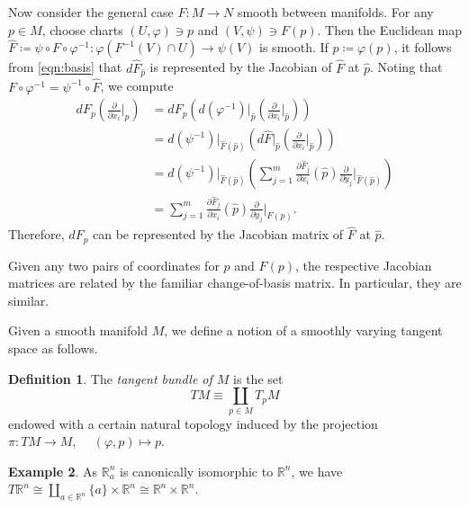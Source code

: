 \documentclass[10pt,letterpaper,cm]{nupset}
\theoremstyle{definition}
\newtheorem{definition}{Definition}[subsection]
\newtheorem{exmp}[definition]{Example}
\theoremstyle{theorem}
\theoremstyle{remark}
\newcommand{\R}{\mathbb R}
\newcommand{\1}{\mathbf{1}}
\newcommand{\0}{\vec 0}
\begin{document}
Now consider the general case $F: M \to N$ smooth between manifolds. For any $p \in M$, choose charts $(U, \varphi) \ni p$ and $(V, \psi) \ni F(p)$. Then the Euclidean map $\widehat{F}\coloneqq  \psi \circ F \circ \varphi^{-1} : \varphi(F^{-1}(V) \cap U) \to \psi(V)$ is smooth. If $\hat{p}\coloneqq  \varphi(p)$, it follows from \eqref{eqn:basis} that $d\widehat{F}_{\hat{p}}$ is represented by the Jacobian of $\widehat{F}$ at $\hat{p}$. Noting that $F \circ \varphi^{-1} = \psi^{-1} \circ \widehat{F}$, we compute
\begin{align*}
dF_p\left(\frac{\partial}{\partial{x_i}}\bigr\rvert_p\right) 
 & =  dF_p\left(d(\varphi^{-1})\bigr\rvert_{\hat{p}}\left(\frac{\partial}{\partial{x_i}}\bigr\rvert_{\hat{p}}\right)\right) 
\\ & = d(\psi^{-1})\bigr\rvert_{\widehat{F}(\hat{p})}\left(d\widehat{F}\bigr\rvert_{\hat{p}}\left(\frac{\partial}{\partial{x_i}}\bigr\rvert_{\hat{p}}\right)\right)
\\ & = d(\psi^{-1})\bigr\rvert_{\widehat{F}(\hat{p})}\left(\sum_{j=1}^m \frac{\partial{\widehat{F}_j}}{\partial{x_i}}(\hat{p})\frac{\partial}{\partial{y_j}}\bigr\rvert_{\widehat{F}(\hat{p})}\right) 
\\ & = 
\sum_{j=1}^m \frac{\partial{\widehat{F}_j}}{\partial{x_i}}(\hat{p})\frac{\partial}{\partial{y_j}}\bigr\rvert_{F(p)}.
\end{align*}
Therefore, $dF_p$ can be represented by the Jacobian matrix of $\widehat{F}$ at $\hat{p}$. 

\smallskip

Given any two pairs of coordinates for $p$ and $F(p)$, the respective Jacobian matrices are related by the familiar change-of-basis matrix. In particular, they are similar.

\bigskip

Given a smooth manifold $M$, we define a notion of a smoothly varying tangent space as follows. 

\begin{definition}
 The \textit{tangent bundle of $M$} is the set  $$TM \equiv \coprod_{p \in M} T_pM$$ endowed with a certain natural topology induced by the projection $\pi: TM \to M, \ \quad (\varphi, p) \mapsto p$.
 \end{definition}

\begin{exmp}
As $\R_a^n$ is canonically isomorphic to $\R^n$, we have $T\R^n \cong \coprod_{a\in \R^n} \{a\} \times \R^n \cong \R^n \times \R^n$.
\end{exmp}
\end{document}
